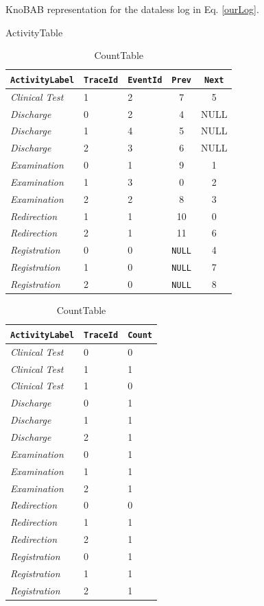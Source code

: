 \documentclass[sigconf]{acmart}
\begin{document}
\begin{table}
\caption{KnoBAB representation for the dataless log in Eq. \ref{ourLog}.}\label{atable}

\begin{subtable}[c]{\linewidth}\centering
\caption{ActivityTable}\label{acttable}
\begin{tabular}{lllcc}
\toprule
     \texttt{ActivityLabel} & \texttt{TraceId} & \texttt{EventId} &  \texttt{Prev} & \texttt{Next}\\
\midrule
    \textit{Clinical Test} & 1 &  2 & 7 & 5\\
    \textit{Discharge} & 0 & 2 & 4 & NULL\\
    \textit{Discharge} & 1 &  4 & 5& NULL\\
    \textit{Discharge} & 2 &  3  & 6& NULL\\
    \textit{Examination} & 0 & 1 & 9 & 1\\
    \textit{Examination} & 1 &  3 & 0& 2\\
    \textit{Examination} & 2 &  2 &8&3\\
    \textit{Redirection} & 1 & 1 & 10 & 0 \\
    \textit{Redirection} & 2 & 1 & 11 & 6\\
    \textit{Registration} & 0 & 0 & \texttt{NULL} & 4\\
    \textit{Registration} & 1 &  0 & \texttt{NULL} & 7\\
    \textit{Registration} & 2 &  0 & \texttt{NULL} &  8\\
\bottomrule
\end{tabular}
\end{subtable}

\begin{subtable}[c]{\linewidth}\centering
\caption{CountTable}\label{counttable}
\begin{tabular}{lll}
\toprule
     \texttt{ActivityLabel} & \texttt{TraceId} & \texttt{Count} \\
\midrule
    \textit{Clinical Test} & 0 &  0\\
    \textit{Clinical Test} & 1 &  1\\
    \textit{Clinical Test} & 1 &  0\\
    \textit{Discharge} & 0 & 1\\
    \textit{Discharge} & 1 & 1\\
    \textit{Discharge} & 2 & 1\\
    \textit{Examination} & 0 & 1\\
    \textit{Examination} & 1 &  1\\
    \textit{Examination} & 2 &  1\\
    \textit{Redirection} & 0 & 0\\
    \textit{Redirection} & 1 & 1\\
    \textit{Redirection} & 2 & 1\\
    \textit{Registration} & 0 & 1\\
    \textit{Registration} & 1 &  1\\
    \textit{Registration} & 2 & 1\\
\bottomrule
\end{tabular}
\end{subtable}

\end{table}
\end{document}
